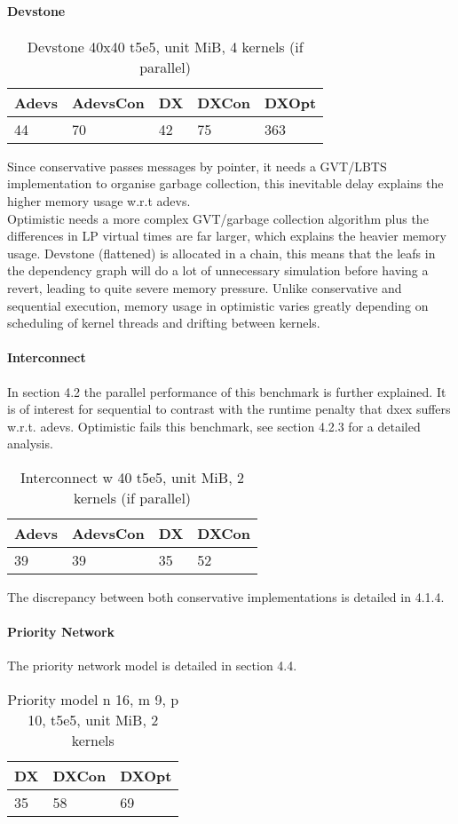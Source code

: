 \paragraph*{Devstone}
\begin{table}[lhtb]
	\centering
	\caption{Devstone 40x40 t5e5, unit MiB, 4 kernels (if parallel)}
	\label{dtone_mem}
	\begin{tabular}{| l | l | l | l | l |}
		\hline
		Adevs & AdevsCon &DX &DXCon &DXOpt\\ \hline
		44 & 70 & 42 & 75 & 363  \\ \hline
	\end{tabular}
\end{table}
Since conservative passes messages by pointer, it needs a GVT/LBTS implementation to organise garbage collection, this inevitable delay explains the higher memory usage w.r.t adevs.\\
Optimistic needs a more complex GVT/garbage collection algorithm plus the differences in LP virtual times are far larger, which explains the heavier memory usage. Devstone (flattened) is allocated in a chain, this means that the leafs in the dependency graph will do a lot of unnecessary simulation before having a revert, leading to quite severe memory pressure. Unlike conservative and sequential execution, memory usage in optimistic varies greatly depending on scheduling of kernel threads and drifting between kernels. 
\paragraph*{Interconnect}
In section 4.2 the parallel performance of this benchmark is further explained. It is of interest for sequential to contrast with the runtime penalty that dxex suffers w.r.t. adevs. Optimistic fails this benchmark, see section 4.2.3 for a detailed analysis.
\begin{table}[lhtb]
	\centering
	\caption{Interconnect w 40 t5e5, unit MiB, 2 kernels (if parallel)}
	\label{iconn_mem}
	\begin{tabular}{| l | l | l | l |}
		\hline
		Adevs & AdevsCon &DX &DXCon\\ \hline
		39 & 39 & 35 & 52  \\ \hline
	\end{tabular}
\end{table}
The discrepancy between both conservative implementations is detailed in 4.1.4.
		
\paragraph*{Priority Network}
The priority network model is detailed in section 4.4.
\begin{table}[lhtb]
	\centering
	\caption{Priority model n 16, m 9, p 10,  t5e5, unit MiB, 2 kernels}
	\label{pmod_mem}
	\begin{tabular}{| l | l | l |}
		\hline
		DX &DXCon &DXOpt\\ \hline
		35 & 58 &69\\ \hline
	\end{tabular}
\end{table}
